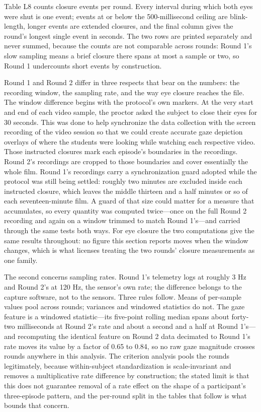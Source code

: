 % 
% 

Table L8 counts closure events per round. Every interval during which both eyes were shut is
one event; events at or below the 500-millisecond ceiling are blink-length, longer events
are extended closures, and the final column gives the round's longest single event in
seconds. The two rows are printed separately and never summed, because the counts are not
comparable across rounds: Round 1's slow sampling means a brief closure there spans at most
a sample or two, so Round 1 undercounts short events by construction.

% 

Round 1 and Round 2 differ in three respects that bear on the numbers: the recording window,
the sampling rate, and the way eye closure reaches the file. The window difference begins
with the protocol's own markers. At the very start and end of each video sample, the proctor
asked the subject to close their eyes for 30 seconds. This was done to help synchronize the
data collection with the screen recording of the video session so that we could create
accurate gaze depiction overlays of where the students were looking while watching each
respective video. Those instructed closures mark each episode's boundaries in the recordings.
Round 2's recordings are cropped to those boundaries and cover essentially the whole film. Round 1's recordings carry a synchronization guard adopted while
the protocol was still being settled: roughly two minutes are excluded inside each instructed
closure, which leaves the middle thirteen and a half minutes or so of each seventeen-minute
film. A guard of that size could matter for a measure that accumulates, so every quantity was
computed twice---once on the full Round 2 recording and again on a window trimmed to match
Round 1's---and carried through the same tests both ways. For eye closure the two
computations give the same results throughout: no figure this section reports moves when the
window changes, which is what licenses treating the two rounds' closure measurements as one
family.

The second concerns sampling rates. Round 1's telemetry logs at roughly 3 Hz and Round 2's at
120 Hz, the sensor's own rate; the difference belongs to the capture software, not to the
sensors. Three rules follow. Means of per-sample values pool across rounds; variances and
windowed statistics do not. The gaze feature is a windowed statistic---its five-point rolling
median spans about forty-two milliseconds at Round 2's rate and about a second and a half at
Round 1's---and recomputing the identical feature on Round 2 data decimated to Round 1's rate
moves its value by a factor of 0.65 to 0.84, so no raw gaze magnitude crosses rounds anywhere
in this analysis. The criterion analysis pools the rounds legitimately, because
within-subject standardization is scale-invariant and removes a multiplicative rate
difference by construction; the stated limit is that this does not guarantee removal of a
rate effect on the shape of a participant's three-episode pattern, and the per-round split in
the tables that follow is what bounds that concern.

